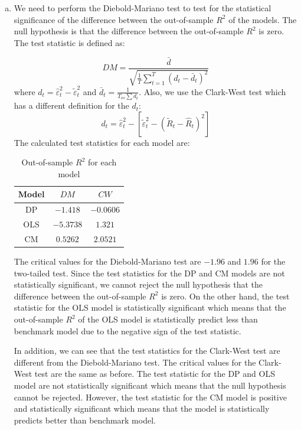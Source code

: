 \begin{enumerate}[(a)]
    \item We need to perform the Diebold-Mariano test to test for the statistical significance of the difference between the out-of-sample $R^2$ of the models. The null hypothesis is that the difference between the out-of-sample $R^2$ is zero. The test statistic is defined as:
    
    \begin{equation*}
        DM = \frac{\bar{d}}{\sqrt{\frac{1}{T}\sum_{t=1}^{T}(d_t -\bar{d}_t)^2}}
    \end{equation*}
    where $d_t = \hat{\varepsilon}_t^2 - \tilde{\varepsilon}_t^2$ and $\bar{d}_t = \frac{1}{T_{os}\sum d_t}$. Also, we use the Clark-West test which has a different definition for the $d_t$:
    \begin{equation*}
        d_t = \hat{\varepsilon}_t^2 - [\tilde{\varepsilon}_t^2 -(\tilde{R}_t - \hat{R}_t)^2]
    \end{equation*}
    The calculated test statistics for each model are:
    \begin{table}[H]
        \centering
        \begin{tabular}{c|c|c}
            Model & $DM$ & $CW$\\
            \hline
            DP &  $-1.418$ & $-0.0606$\\
            OLS &  $-5.3738$ & $1.321$ \\
            CM & $0.5262$ & $2.0521$\\
        \end{tabular}
        \caption{Out-of-sample $R^2$ for each model}
        \label{tab:my_label}
    \end{table}

    The critical values for the Diebold-Mariano test are $-1.96$ and $1.96$ for the two-tailed test. Since the test statistics for the DP and CM models are not statistically significant, we cannot reject the null hypothesis that the difference between the out-of-sample $R^2$ is zero. On the other hand, the test statistic for the OLS model is statistically significant which means that the out-of-sample $R^2$ of the OLS model is statistically predict less than benchmark model due to the negative sign of the test statistic. 

    In addition, we can see that the test statistics for the Clark-West test are different from the Diebold-Mariano test. The critical values for the Clark-West test are the same as before. The test statistic for the DP and OLS model are not statistically significant which means that the null hypothesis cannot be rejected. However, the test statistic for the CM model is positive and statistically significant which means that  the model is statistically predicts better than benchmark model.


\end{enumerate}
